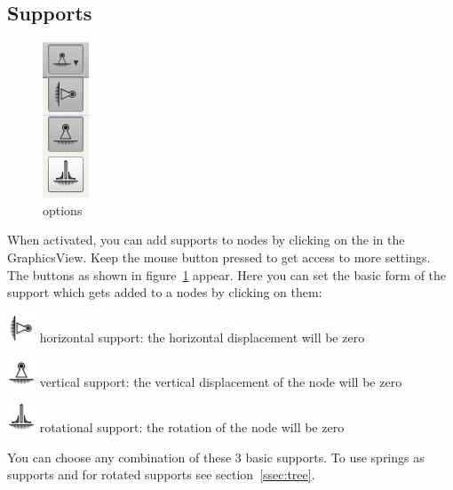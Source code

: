 \documentclass[a4paper,11pt]{report}
\begin{document}
\subsection{Supports}
\begin{minipage}[h]{4cm}
\begin{figure}[H]
\begin{center}
\includegraphics[scale=0.6]{../pictures/support_opt.png}
\caption{options}
\label{pic:support_opt}
\end{center}
\end{figure}
\end{minipage}
\begin{minipage}[h]{\textwidth-4cm}
When activated, you can add supports to nodes by clicking on the in the GraphicsView. Keep the mouse button pressed to get access to more settings. The buttons as shown in figure~\ref{pic:support_opt} appear. Here you can set the basic form of the support which gets added to a nodes by clicking on them:
\begin{trivlist}
	\item[] \includegraphics[scale = 0.5]{../../icons/bearingH.png} horizontal support: the horizontal displacement will be zero
	\item[] \includegraphics[scale = 0.5]{../../icons/bearing.png} vertical support: the vertical displacement of the node will be zero
	\item[] \includegraphics[scale = 0.5]{../../icons/bearingM.png} rotational support: the rotation of the node will be zero
\end{trivlist}
You can choose any combination of these 3 basic supports. To use springs as supports and for rotated supports see section~\ref{ssec:tree}.
\end{minipage}
\end{document}
